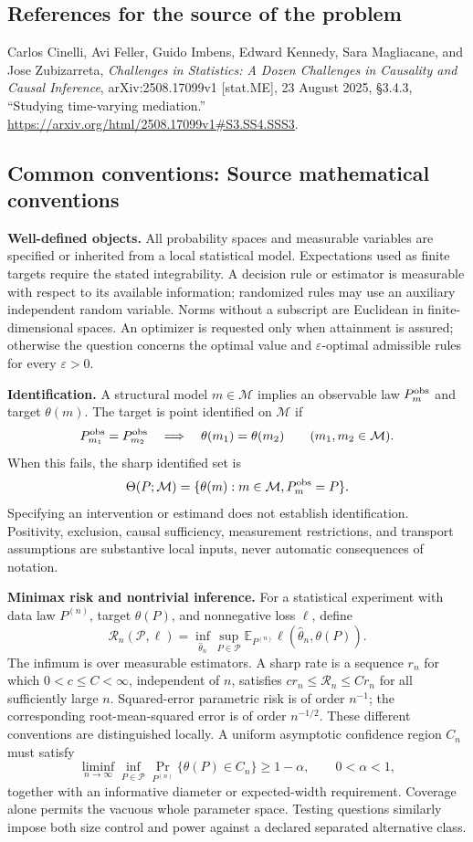 \documentclass[11pt,a4paper]{article}
\newcommand{\E}{\mathbb E}
\begin{document}
\subsection*{References for the source of the problem}
Carlos Cinelli, Avi Feller, Guido Imbens, Edward Kennedy, Sara Magliacane, and Jose Zubizarreta, \emph{Challenges in Statistics: A Dozen Challenges in Causality and Causal Inference}, arXiv:2508.17099v1 [stat.ME], 23 August 2025, \S3.4.3, ``Studying time-varying mediation.'' \url{https://arxiv.org/html/2508.17099v1#S3.SS4.SSS3}.

\subsection*{Common conventions: Source mathematical conventions}

\textbf{Well-defined objects.}
All probability spaces and measurable variables are specified or inherited
from a local statistical model. Expectations used as finite targets require
the stated integrability. A decision rule or estimator is measurable with
respect to its available information; randomized rules may use an auxiliary
independent random variable. Norms without a subscript are Euclidean in
finite-dimensional spaces. An optimizer is requested only when attainment
is assured; otherwise the question concerns the optimal value and
$\varepsilon$-optimal admissible rules for every $\varepsilon>0$.

\textbf{Identification.}
A structural model $m\in\mathcal M$ implies an observable law
$P_m^{\rm obs}$ and target $\theta(m)$. The target is point identified on
$\mathcal M$ if
\[
 P_{m_1}^{\rm obs}=P_{m_2}^{\rm obs}
 \quad\Longrightarrow\quad\theta(m_1)=\theta(m_2)
 \qquad(m_1,m_2\in\mathcal M).
\]
When this fails, the sharp identified set is
\[
 \Theta(P;\mathcal M)=\{\theta(m):m\in\mathcal M,
                                  P_m^{\rm obs}=P\}.
\]
Specifying an intervention or estimand does not establish identification.
Positivity, exclusion, causal sufficiency, measurement restrictions, and
transport assumptions are substantive local inputs, never automatic
consequences of notation.

\textbf{Minimax risk and nontrivial inference.}
For a statistical experiment with data law $P^{(n)}$, target $\theta(P)$,
and nonnegative loss $\ell$, define
\[
 \mathcal R_n(\mathcal P,\ell)
   =\inf_{\widehat\theta_n}\sup_{P\in\mathcal P}
      \E_{P^{(n)}}\ell(\widehat\theta_n,\theta(P)).
\]
The infimum is over measurable estimators. A sharp rate is a sequence
$r_n$ for which $0<c\leq C<\infty$, independent of $n$, satisfies
$c r_n\leq\mathcal R_n\leq C r_n$ for all sufficiently large $n$.
Squared-error parametric risk is of order $n^{-1}$; the corresponding
root-mean-squared error is of order $n^{-1/2}$. These different conventions
are distinguished locally. A uniform asymptotic confidence region $C_n$
must satisfy
\[
 \liminf_{n\to\infty}\inf_{P\in\mathcal P}
     \Pr_{P^{(n)}}\{\theta(P)\in C_n\}\geq 1-\alpha,
 \qquad 0<\alpha<1,
\]
together with an informative diameter or expected-width requirement.
Coverage alone permits the vacuous whole parameter space. Testing questions
similarly impose both size control and power against a declared separated
alternative class.
\end{document}
